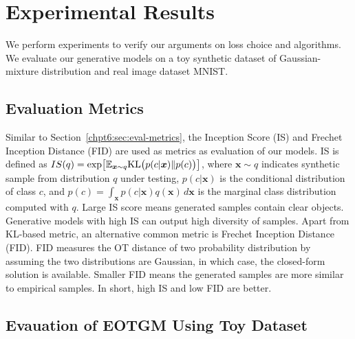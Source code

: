 \section{Experimental Results}
We perform experiments to verify our arguments on loss choice and algorithms. We evaluate our
generative models on a toy synthetic dataset of Gaussian-mixture distribution and real image dataset MNIST.

\subsection{Evaluation Metrics}\label{subsec-metric}
Similar to Section~\ref{chpt6:sec:eval-metrics}, the Inception Score (IS) \cite{NIPS2016_6125} and Frechet Inception Distance (FID)\cite{2017arXiv170608500H} are used as metrics as evaluation of our models. IS is defined as $
  IS(q) = \exp\bigl[ \mathbb{E}_{\bm{x} \sim q} \mathrm{KL}\bigl( p(c | \bm{x})\| p(c) \bigr)  \bigr]$,
where $\bm{x}\sim q$ indicates synthetic sample from distribution $q$ under testing, $p(c|\bm{x})$ is the conditional distribution of class $c$, and $p(c) = \int_{\bm{x}}p(c|\bm{x})q(\bm{x}) \,d \bm{x} $ is the marginal class distribution computed with $q$. Large IS score means generated samples contain clear objects. Generative models with high IS can output high diversity of samples. Apart from KL-based metric, an alternative common metric is Frechet Inception Distance (FID)\cite{2017arXiv170608500H}. FID measures the OT distance of two probability distribution by assuming the two distributions are Gaussian, in which case, the closed-form solution is available. Smaller FID means the generated samples are more similar to empirical samples. In short, high IS and low FID are better.


\subsection{Evauation of EOTGM Using Toy Dataset}\label{subsec-mg}

